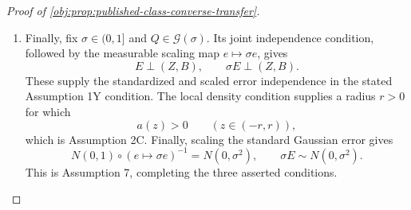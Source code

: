 \begin{proof}[Proof of \cref{obj:prop:published-class-converse-transfer}]
\begin{enumerate}
Now let \(I=[\ell,\upsilon]\) be any interval procedure honest on \(\mathcal G(\sigma)\). For every benchmark law \(P\), its embedded law \(Q\) satisfies
\[
\mathbb P_{P,n}\{\theta(P)\in I\}
=
Q\{\vartheta(Q)\in I\}
\ge0.9.
\]
Thus \(I\) belongs to the benchmark honest interval class of \cref{obj:def:honest-class}. Moreover,
\[
\mathcal L_\beta(n,\sigma)
\le
\sup_{P\in\mathcal M_\beta(\sigma)}
\mathbb E_{P,n}[\upsilon-\ell]
\le
\sup_{Q\in\mathcal G(\sigma)}
\mathbb E_Q[\upsilon-\ell].
\]
The second inequality follows from experiment preservation. Taking the infimum over intervals honest on \(\mathcal G(\sigma)\) proves the extended minimax comparison; the finite bound \(2\) permits its conversion to real values. Therefore
\[
\mathcal L_\beta(n,\sigma)\le\mathcal L_{\mathcal G}(n,\sigma).
\]
Combining these comparisons with the lower bounds already obtained yields
\[
c\,r_\beta(n,\sigma)
\le R_\beta(n,\sigma)
\le\mathcal R_{\mathcal G}(n,\sigma),
\qquad
c\,r_\beta(n,\sigma)
\le\mathcal L_\beta(n,\sigma)
\le\mathcal L_{\mathcal G}(n,\sigma).
\]

\item Finally, fix \(\sigma\in(0,1]\) and \(Q\in\mathcal G(\sigma)\). Its joint independence condition, followed by the measurable scaling map \(e\mapsto\sigma e\), gives
\[
E\perp(Z,B),
\qquad
\sigma E\perp(Z,B).
\]
These supply the standardized and scaled error independence in the stated Assumption 1Y condition. The local density condition supplies a radius \(r>0\) for which
\[
a(z)>0\qquad(z\in(-r,r)),
\]
which is Assumption 2C. Finally, scaling the standard Gaussian error gives
\[
N(0,1)\circ(e\mapsto\sigma e)^{-1}=N(0,\sigma^2),
\qquad
\sigma E\sim N(0,\sigma^2).
\]
This is Assumption 7, completing the three asserted conditions.
\end{enumerate}
\end{proof}


